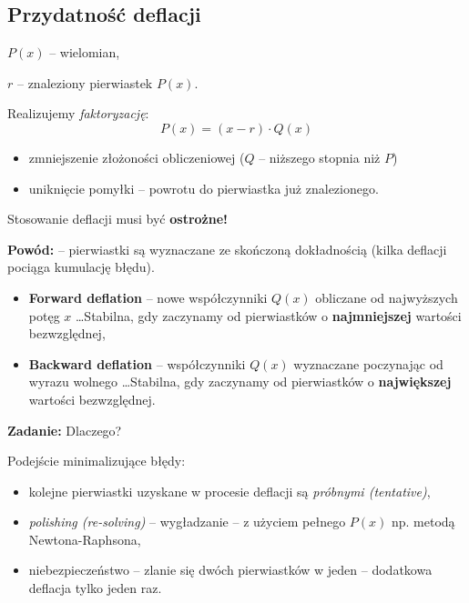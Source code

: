 \subsection{Przydatność deflacji}

\begin{frame}
  $P(x)$ -- wielomian,

  $r$ -- znaleziony pierwiastek $P(x)$.

  Realizujemy \textit{faktoryzację}:
  $$ P(x) = (x - r) \cdot Q(x) $$

  \begin{itemize}
    \item zmniejszenie złożoności obliczeniowej ($Q$ -- niższego stopnia niż $P$)
    \item uniknięcie pomyłki -- powrotu do pierwiastka już znalezionego.
  \end{itemize}
\end{frame}

\begin{frame}
  Stosowanie deflacji musi być \textbf{ostrożne!}

  \textbf{Powód:} -- pierwiastki są wyznaczane ze skończoną dokładnością (kilka deflacji pociąga kumulację błędu).

  \begin{itemize}
    \item \textbf{Forward deflation} -- nowe współczynniki $Q(x)$ obliczane od najwyższych potęg $x$ \dots Stabilna, gdy zaczynamy od pierwiastków o \textbf{najmniejszej} wartości bezwzględnej,
    \item \textbf{Backward deflation} -- współczynniki $Q(x)$ wyznaczane poczynając od wyrazu wolnego \dots Stabilna, gdy zaczynamy od pierwiastków o \textbf{największej} wartości bezwzględnej.
  \end{itemize}

  \textbf{Zadanie:} Dlaczego?
\end{frame}

\begin{frame}
  Podejście minimalizujące błędy:
  \begin{itemize}
    \item kolejne pierwiastki uzyskane w procesie deflacji są \textit{próbnymi (tentative)},
    \item \textit{polishing (re-solving)} -- wygładzanie -- z użyciem pełnego $P(x)$ np. metodą Newtona-Raphsona,
    \item niebezpieczeństwo -- zlanie się dwóch pierwiastków w jeden -- dodatkowa deflacja tylko jeden raz.
  \end{itemize}
\end{frame}
